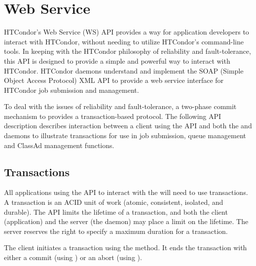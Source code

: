 \section{\label{API-WebService} Web Service}

HTCondor's Web Service (WS) API provides a way for application developers
to interact with HTCondor, without needing to utilize
HTCondor's command-line tools.
In keeping with the HTCondor philosophy of reliability and fault-tolerance,
this API is designed to provide a simple and powerful way
to interact with HTCondor.
HTCondor daemons understand and implement
the SOAP (Simple Object Access Protocol) XML API
to provide a web service interface for HTCondor job submission
and management.

To deal with the issues of reliability and fault-tolerance,
a two-phase commit mechanism to provides a transaction-based protocol.  
The following API description describes interaction
between a client using the API and both the  and 
 daemons to illustrate transactions
for use in job submission, queue management and ClassAd 
management functions.

\subsection{\label{WebService-Transactions} Transactions}

All applications using the API to interact with the 
will need to use transactions.
A transaction is
an ACID unit of work (atomic, consistent, isolated, and durable).
The API limits the lifetime of a transaction,
and both the client (application) and the server
(the  daemon)
may place a limit on the lifetime.
The server reserves the right to specify a maximum
duration for a transaction. 


The client initiates a transaction using the
 method. 
It ends the transaction with either 
a commit (using )
or an abort (using ).

